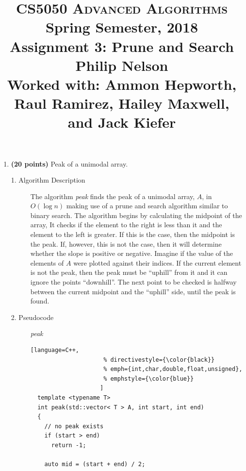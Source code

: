 \documentclass[11pt]{article}
\begin{document}
\baselineskip=14.0pt

\title{CS5050 \textsc{Advanced Algorithms}
\\{\Large Spring Semester, 2018}
\\ Assignment 3: Prune and Search
\\ {\bf Philip Nelson}
\\ {\large Worked with: Ammon Hepworth, Raul Ramirez, Hailey Maxwell, and Jack Kiefer}}
\date{}

\maketitle

\vspace{-0.7in}

\begin{enumerate}
\item %
{\bf (20 points)}
Peak of a unimodal array.

  \begin{description}
  \item[1. Algorithm Description]

    The algorithm \textit{peak} finds the peak of a unimodal array, $A$, in $O(\log{n})$ making use of a prune and search algorithm similar to binary search. The algorithm begins by calculating the midpoint of the array, It checks if the element to the right is less than it and the element to the left is greater. If this is the case, then the midpoint is the peak. If, however, this is not the case, then it will determine whether the slope is positive or negative. Imagine if the value of the elements of $A$ were plotted against their indices. If the current element is not the peak, then the peak must be ``uphill'' from it and it can ignore the points ``downhill''. The next point to be checked is halfway between the current midpoint and the ``uphill'' side, until the peak is found.

  \item[2. Pseudocode]
    \textit{peak}
  \begin{lstlisting}[language=C++,
                     % directivestyle={\color{black}}
                     % emph={int,char,double,float,unsigned},
                     % emphstyle={\color{blue}}
                    ]
  template <typename T>
  int peak(std::vector< T > A, int start, int end)
  {
    // no peak exists
    if (start > end)
      return -1;

    auto mid = (start + end) / 2;


\end{lstlisting}
\end{description}
\end{enumerate}
\end{document}
